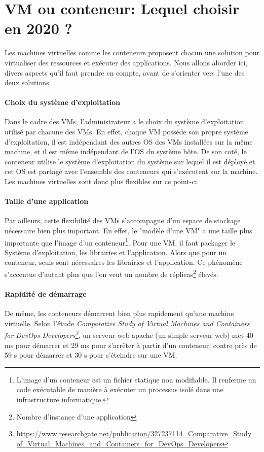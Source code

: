 \documentclass[11pt,fleqn]{book} %
\begin{document}
\section{VM ou conteneur: Lequel choisir en 2020 ? }
Les machines virtuelles comme les conteneurs proposent chacun une solution pour virtualiser des ressources et exécuter des applications. Nous allons aborder ici, divers aspects qu'il faut prendre en compte, avant de s'orienter vers l'une des deux solutions.

\paragraph{Choix du système d'exploitation}
Dans le cadre des VMs, l'administrateur a le choix du système d'exploitation utilisé par chacune des VMs. En effet, chaque VM possède son propre système d'exploitation, il est indépendant des autres OS des VMs installées sur la même machine, et il est même indépendant de l'OS du système hôte. De son coté, le conteneur utilise le système d'exploitation du système sur lequel il est déployé et cet OS est partagé avec l'ensemble des conteneurs qui s'exécutent sur la machine. Les machines virtuelles sont donc plus flexibles sur ce point-ci.

\paragraph{Taille d'une application}
Par ailleurs, cette flexibilité des VMs s'accompagne d'un espace de stockage nécessaire bien plus important. En effet, le "modèle d'une VM" a une taille plus importante que l'image d'un conteneur\footnote{L'image d'un conteneur est un fichier statique non modifiable. Il renferme un code exécutable de manière à exécuter un processus isolé dans une infrastructure informatique.}. Pour une VM, il faut packager le Système d'exploitation, les librairies et l'application. Alors que pour un conteneur, seuls sont nécessaires les librairies et l'application. Ce phénomène s'accentue d'autant plus que l'on veut un nombre de réplicas\footnote{Nombre d'instance d'une application} élevés.

\paragraph{Rapidité de démarrage}
De même, les conteneurs démarrent bien plus rapidement qu'une machine virtuelle.
Selon l'étude \textit{Comparative Study of Virtual Machines and Containers for DevOps Developers\footnote{\url{https://www.researchgate.net/publication/327237114_Comparative_Study_of_Virtual_Machines_and_Containers_for_DevOps_Developers}}}, un serveur web apache (un simple serveur web) met 40 ms pour démarrer et 29 ms pour s'arrêter à partir d'un conteneur, contre près de 59 s pour démarrer et 30 s pour s'éteindre sur une VM.
\end{document}
